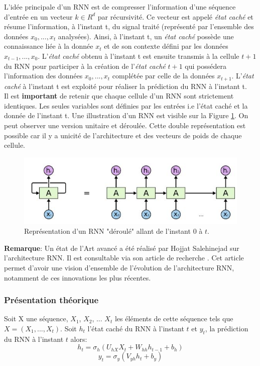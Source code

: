 \noindent L'idée principale d'un RNN est de compresser l'information d'une séquence d'entrée en un vecteur $k \in R^d$ par récursivité. Ce vecteur est appelé \textit{état caché} et résume l'information, à l'instant t, du signal traité (représenté par l'ensemble des données $x_0,...,x_t$ analysées). Ainsi, à l'instant t, un \textit{état caché} possède une connaissance liée à la donnée $x_t$ et de son contexte défini par les données $x_{t-1},...,x_0$. L'\textit{état caché} obtenu à l'instant t est ensuite transmis à la cellule $t+1$ du RNN pour participer à la création de l'\textit{état caché} $t+1$ qui possédera l'information des données $x_0,...,x_t$ complétée par celle de la données $x_{t+1}$. L'\textit{état caché} à l'instant t est exploité pour réaliser la prédiction du RNN à l'instant t.\\

\noindent Il est \textbf{important} de retenir que chaque cellule d'un RNN sont strictement identiques. Les seules variables sont définies par les entrées i.e l'état caché et la donnée de l'instant t. Une illustration d'un RNN est visible sur la Figure \ref{RNNunrolled}. On peut observer une version unitaire et déroulée. Cette double représentation est possible car il y a unicité de l'architecture et des vecteurs de poids de chaque cellule.\\

\begin{figure}
\centering
    \includegraphics[scale=0.5]{./tex/recurrent-neural-network/rnn.jpg}
    \caption{Représentation d'un RNN "déroulé" allant de l'instant $0$ à $t$.}
    \label{RNNunrolled}
\end{figure}

\noindent \textbf{Remarque}: Un état de l'Art avancé a été réalisé par Hojjat Salehinejad sur l'architecture RNN. Il est consultable via son article de recherche \cite{rnn_news}. Cet article permet d'avoir une vision d'ensemble de l'évolution de l'architecture RNN, notamment de ces innovations les plus récentes.

\subsubsection{Présentation théorique}
\noindent Soit X une séquence, $X_1$, $X_2$, ... $X_t$ les éléments de cette séquence tels que $X = (X_1, ..., X_t)$. Soit $h_t$ l'état caché du RNN à l'instant $t$ et $y_t$, la prédiction du RNN à l'instant $t$ alors:
$$h_t = \sigma_h(U_{hX}X_t + W_{hh} h_{t-1} + b_h)$$
$$y_t = \sigma_y(V_{yh}h_t + b_y)$$


